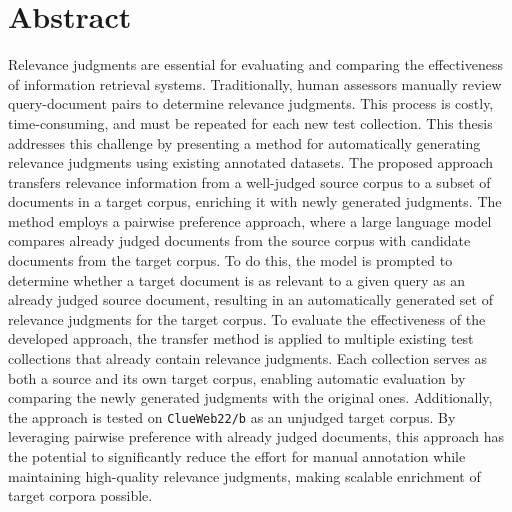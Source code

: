\section*{Abstract}

Relevance judgments are essential for evaluating and comparing the effectiveness of information retrieval systems. Traditionally, human assessors manually review query-document pairs to determine relevance judgments. This process is costly, time-consuming, and must be repeated for each new test collection. This thesis addresses this challenge by presenting a method for automatically generating relevance judgments using existing annotated datasets. The proposed approach transfers relevance information from a well-judged source corpus to a subset of documents in a target corpus, enriching it with newly generated judgments. The method employs a pairwise preference approach, where a large language model compares already judged documents from the source corpus with candidate documents from the target corpus. To do this, the model is prompted to determine whether a target document is as relevant to a given query as an already judged source document, resulting in an automatically generated set of relevance judgments for the target corpus. To evaluate the effectiveness of the developed approach, the transfer method is applied to multiple existing test collections that already contain relevance judgments. Each collection serves as both a source and its own target corpus, enabling automatic evaluation by comparing the newly generated judgments with the original ones. Additionally, the approach is tested on \texttt{ClueWeb22/b} as an unjudged target corpus. By leveraging pairwise preference with already judged documents, this approach has the potential to significantly reduce the effort for manual annotation while maintaining high-quality relevance judgments, making scalable enrichment of target corpora possible.

